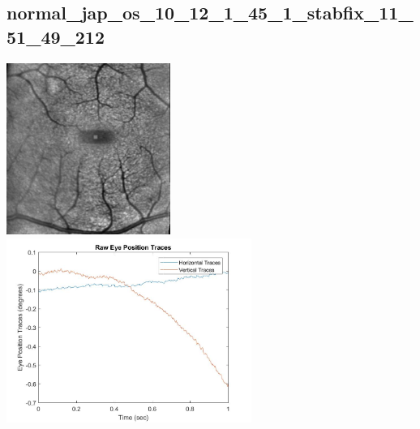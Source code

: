 \documentclass[11pt]{article}
\begin{document}
\subsection{normal\_jap\_os\_10\_12\_1\_45\_1\_stabfix\_11\_51\_49\_212}
\includegraphics[width=0.40\textwidth, valign=m]{referenceframes/tslo_normal/normal_jap_os_10_12_1_45_1_stabfix_11_51_49_212_dwt_nostim_gamscaled_bandfilt_refframe.jpg}
\includegraphics[width=0.60\textwidth, valign=m]{eyepositiontraces/tslo_normal/normal_jap_os_10_12_1_45_1_stabfix_11_51_49_212.jpg}\\
\end{document}
